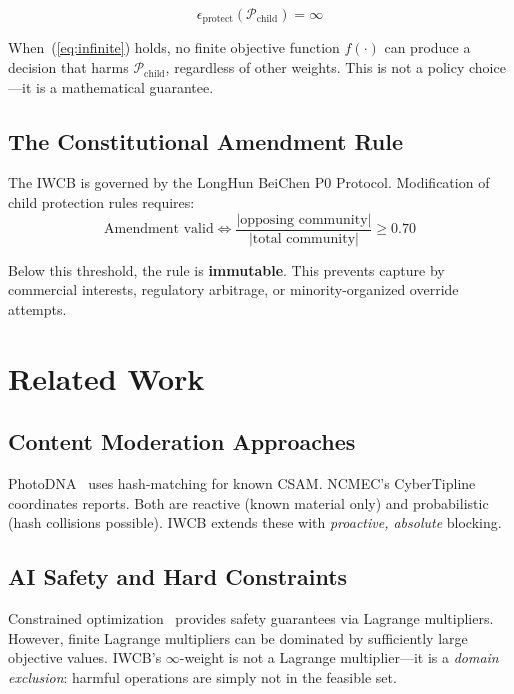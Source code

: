 \documentclass[conference]{IEEEtran}
\begin{document}
\begin{equation}
  \epsilon_{\text{protect}}(\mathcal{P}_{\text{child}}) = \infty
  \label{eq:infinite}
\end{equation}

When~(\ref{eq:infinite}) holds, no finite objective function
$f(\cdot)$ can produce a decision that harms
$\mathcal{P}_{\text{child}}$, regardless of other weights.
This is not a policy choice---it is a mathematical guarantee.

\subsection{The Constitutional Amendment Rule}

The IWCB is governed by the LongHun BeiChen P0 Protocol.
Modification of child protection rules requires:
\begin{equation}
  \text{Amendment valid} \iff
  \frac{|\text{opposing community}|}{|\text{total community}|}
  \geq 0.70
  \label{eq:supermajority}
\end{equation}

Below this threshold, the rule is \textbf{immutable}.
This prevents capture by commercial interests,
regulatory arbitrage, or minority-organized override attempts.

\section{Related Work}

\subsection{Content Moderation Approaches}
PhotoDNA~\cite{PhotoDNA} uses hash-matching for known CSAM.
NCMEC's CyberTipline~\cite{NCMEC} coordinates reports.
Both are reactive (known material only) and probabilistic
(hash collisions possible).
IWCB extends these with \emph{proactive, absolute} blocking.

\subsection{AI Safety and Hard Constraints}
Constrained optimization~\cite{Altman1999} provides safety
guarantees via Lagrange multipliers.
However, finite Lagrange multipliers can be dominated
by sufficiently large objective values.
IWCB's $\infty$-weight is not a Lagrange multiplier---it
is a \emph{domain exclusion}: harmful operations
are simply not in the feasible set.
\end{document}

